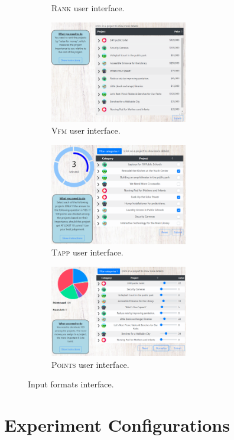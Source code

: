 \documentclass[runningheads]{llncs}
\newcommand{\points}{\textsc{Points}}
\newcommand{\rank}{\textsc{Rank}}
\newcommand{\vfm}{\textsc{Vfm}}
\newcommand{\tapp}{\textsc{Tapp}}
\begin{document}
\begin{figure}[ht!]
\begin{subfigure}[b]{0.45\textwidth}
\caption{\rank{} user interface.
}\label{fig:rank_inter}
     \end{subfigure}
     \hfill
     \begin{subfigure}[b]{0.45\textwidth}
         \centering
\includegraphics[width=6cm]{experiment/ranking by cost.PNG}
\caption{\vfm{} user interface.
}\label{fig:vfm_inter}
     \end{subfigure}
     \begin{subfigure}[b]{0.45\textwidth}
         \centering
\includegraphics[width=6cm]{experiment/threshold approval.PNG}
\caption{\tapp{} user interface.
}\label{fig:tapp_inter}
     \end{subfigure}
     \hfill
     \begin{subfigure}[b]{0.45\textwidth}
         \centering
\includegraphics[width=6cm]{experiment/utilities.PNG}
\caption{\points{} user interface.
}\label{fig:util_inter}
     \end{subfigure}
     

        \caption{Input formats interface.}
        \label{fig:all_interfaces}
\end{figure}


\section{Experiment Configurations}\label{app:elections}
\end{document}
